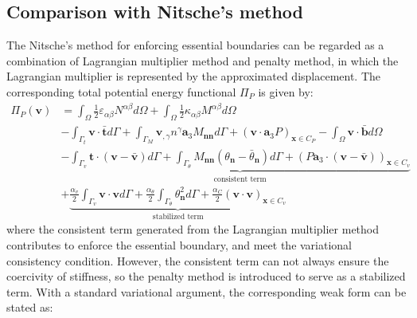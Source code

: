 \subsection{Comparison with Nitsche's method}
The Nitsche's method for enforcing essential boundaries can be regarded as a combination of Lagrangian multiplier method and penalty method, in which the Lagrangian multiplier is represented by the approximated displacement. The corresponding total potential energy functional $\Pi_P$ is given by:
\begin{equation}
\begin{split}
\Pi_P(\boldsymbol v) &= \int_\Omega \frac{1}{2}\varepsilon_{\alpha\beta} N^{\alpha\beta} d\Omega +
\int_\Omega \frac{1}{2} \kappa_{\alpha\beta}M^{\alpha\beta} d\Omega \\
                     &- \int_{\Gamma_t} \boldsymbol v \cdot \bar{\boldsymbol t} d\Gamma 
                     + \int_{\Gamma_M} \boldsymbol v_{,\gamma} n^\gamma \boldsymbol a_3 M_{\boldsymbol{nn}} d\Gamma
                     + (\boldsymbol v \cdot \boldsymbol a_3 P)_{\boldsymbol x \in C_P}
                     - \int_\Omega \boldsymbol v \cdot \bar{\boldsymbol b} d\Omega \\
                     &- \underbrace{\int_{\Gamma_v} \boldsymbol t \cdot (\boldsymbol v - \bar{\boldsymbol v}) d\Gamma
                     + \int_{\Gamma_\theta} M_{\boldsymbol{nn}}(\theta_{\boldsymbol n} - \bar \theta_{\boldsymbol n})d\Gamma
                     + (P\boldsymbol a_3 \cdot (\boldsymbol v - \bar{\boldsymbol v}))_{\boldsymbol x \in C_v}}_{\text{consistent term}} \\
                     &+ \underbrace{\frac{\alpha_v}{2} \int_{\Gamma_v} \boldsymbol v \cdot \boldsymbol v d\Gamma 
                     + \frac{\alpha_\theta}{2} \int_{\Gamma_\theta} \theta_{\boldsymbol n}^2 d\Gamma
             + \frac{\alpha_C}{2}(\boldsymbol v \cdot \boldsymbol v)_{\boldsymbol x\in C_v}}_{\text{stabilized term}}
\end{split}
\end{equation}
where the consistent term generated from the Lagrangian multiplier method contributes to enforce the essential boundary, and meet the variational consistency condition. However, the consistent term can not always ensure the coercivity of stiffness, so the penalty method is introduced to serve as a stabilized term. With a standard variational argument, the corresponding weak form can be stated as:
